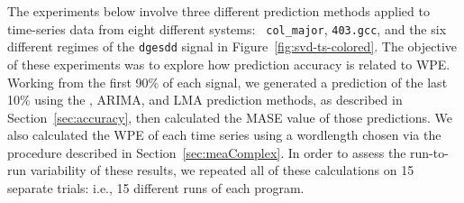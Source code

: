 







The experiments below involve three different prediction methods
applied to time-series data from eight different systems: {\tt
  col\_major}, {\tt 403.gcc}, and the six different regimes of the
{\tt dgesdd} signal in Figure~\ref{fig:svd-ts-colored}.  The objective
of these experiments was to explore how prediction accuracy is related
to WPE.
% 
% 
Working from the first 90\% of each signal, we generated a prediction
of the last 10\% using the \naive, ARIMA, and LMA prediction methods,
as described in Section~\ref{sec:accuracy}, then calculated the MASE
value of those predictions.  We also calculated the WPE of each time
series using a wordlength chosen via the procedure described in
Section~\ref{sec:meaComplex}.  In order to assess the run-to-run
variability of these results, we repeated all of these calculations on
15 separate trials: i.e., 15 different runs of each program.


